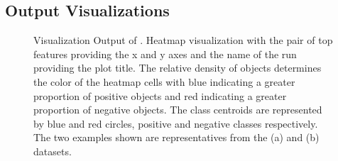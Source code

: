 
\subsection{Output Visualizations}\label{ssec:viz}

\begin{figure}[h]
\centering %
\vspace{-5mm}
\vspace{-5mm}
\caption{Visualization Output of \genviz. Heatmap visualization with the pair of top features providing the x and y axes and the name of the run providing the plot title. The relative density of objects determines the color of the heatmap cells with blue indicating a greater proportion of positive objects and red indicating a greater proportion of negative objects. The class centroids are represented by blue and red circles, positive and negative classes respectively. The two examples shown are representatives from the (a) \msig and (b) \lincs datasets. }
\vspace{-5mm}
\label{fig:viz}
\end{figure}
